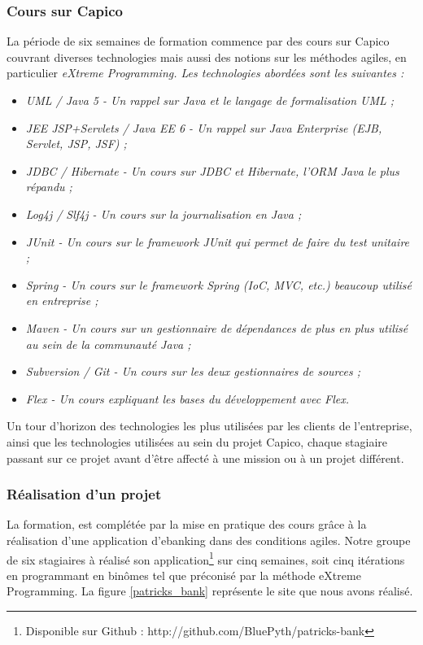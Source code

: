 \subsubsection{Cours sur Capico}
La période de six semaines de formation commence par des cours sur Capico couvrant diverses technologies mais aussi des notions sur les méthodes agiles, en particulier \em{eXtreme Programming}. Les technologies abordées sont les suivantes :

\begin{itemize}
  \item \em{UML / Java 5} - Un rappel sur Java et le langage de formalisation UML ;
  \item \em{JEE JSP+Servlets / Java EE 6} - Un rappel sur Java Enterprise (EJB, Servlet, JSP, JSF) ;
  \item \em{JDBC / Hibernate} - Un cours sur JDBC et Hibernate, l'ORM Java le plus répandu ;
  \item \em{Log4j / Slf4j} - Un cours sur la journalisation en Java ;
  \item \em{JUnit} - Un cours sur le framework JUnit qui permet de faire du test unitaire ;
  \item \em{Spring} - Un cours sur le framework Spring (IoC, MVC, etc.) beaucoup utilisé en entreprise ;
  \item \em{Maven} - Un cours sur un gestionnaire de dépendances de plus en plus utilisé au sein de la communauté Java ;
  \item \em{Subversion / Git} - Un cours sur les deux gestionnaires de sources ;
  \item \em{Flex} - Un cours expliquant les bases du développement avec Flex.
\end{itemize}

Un tour d'horizon des technologies les plus utilisées par les clients de l'entreprise, ainsi que les technologies utilisées au sein du projet Capico, chaque stagiaire passant sur ce projet avant d'être affecté à une mission ou à un projet différent.

\subsubsection{Réalisation d'un projet}

La formation, est complétée par la mise en pratique des cours grâce à la réalisation d'une application d'ebanking dans des conditions agiles. Notre groupe de six stagiaires à réalisé son application\footnote{Disponible sur Github : http://github.com/BluePyth/patricks-bank} sur cinq semaines, soit cinq itérations en programmant en binômes tel que préconisé par la méthode eXtreme Programming. La figure \ref{patricks_bank} représente le site que nous avons réalisé.

